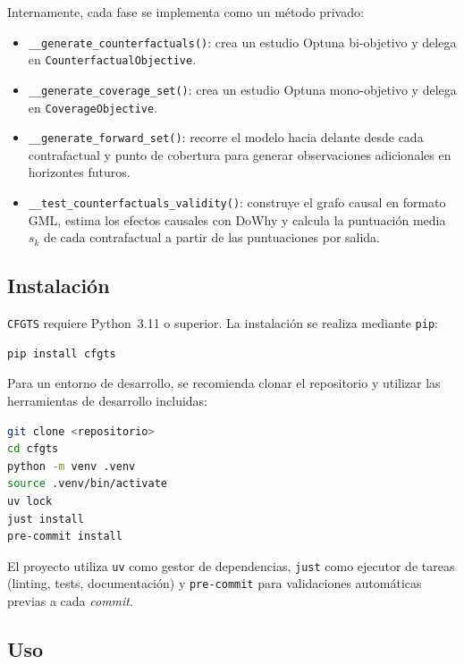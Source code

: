 \documentclass[12pt]{report} %
\begin{document}
Internamente, cada fase se implementa como un método privado:
\begin{itemize}
    \item \texttt{\_\_generate\_counterfactuals()}: crea un estudio Optuna bi-objetivo y delega en \texttt{CounterfactualObjective}.
    \item \texttt{\_\_generate\_coverage\_set()}: crea un estudio Optuna mono-objetivo y delega en \texttt{CoverageObjective}.
    \item \texttt{\_\_generate\_forward\_set()}: recorre el modelo hacia delante desde cada contrafactual y punto de cobertura para generar observaciones adicionales en horizontes futuros.
    \item \texttt{\_\_test\_counterfactuals\_validity()}: construye el grafo causal en formato GML, estima los efectos causales con DoWhy y calcula la puntuación media $s_k$ de cada contrafactual a partir de las puntuaciones por salida.
\end{itemize}

\subsection{Instalación}

\texttt{CFGTS} requiere Python~3.11 o superior. La instalación se realiza mediante \texttt{pip}:

\begin{lstlisting}[language=bash, caption={Instalación de CFGTS}]
pip install cfgts
\end{lstlisting}

Para un entorno de desarrollo, se recomienda clonar el repositorio y utilizar las herramientas de desarrollo incluidas:

\begin{lstlisting}[language=bash, caption={Configuración del entorno de desarrollo}]
git clone <repositorio>
cd cfgts
python -m venv .venv
source .venv/bin/activate
uv lock
just install
pre-commit install
\end{lstlisting}

El proyecto utiliza \texttt{uv} como gestor de dependencias, \texttt{just} como ejecutor de tareas (linting, tests, documentación) y \texttt{pre-commit} para validaciones automáticas previas a cada \textit{commit}.

\subsection{Uso}
\end{document}
